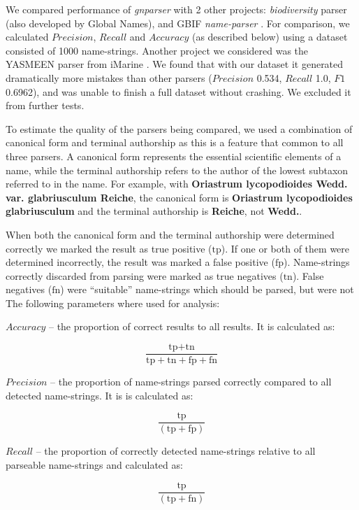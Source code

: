 \documentclass{bmcart}
\begin{document}
We compared performance of \textit{gnparser} with 2 other projects:
\textit{biodiversity} parser \cite{Boyle2013, biodiversity} (also developed by
Global Names), and GBIF \textit{name-parser} \cite{gbifNameParser}. For
comparison, we calculated $Precision$, $Recall$ and $Accuracy$ (as described
below) using a dataset consisted of 1000 name-strings. Another project we
considered was the YASMEEN parser from iMarine  \cite{VandenBerghe2015}. We found that with our dataset it generated dramatically more mistakes
than other parsers ($Precision$ 0.534, $Recall$ 1.0, $F1$ 0.6962), and was
unable to finish a full dataset without crashing. We excluded it from further tests.

To estimate the quality of the parsers being compared, we used a
combination of canonical form and terminal authorship as this is a feature that  common to all three parsers.  A canonical form
represents the essential scientific elements of a name, while the terminal authorship
refers to the author of the lowest subtaxon referred to in the name. For
example, with \textbf{Oriastrum lycopodioides Wedd.  var.  glabriusculum Reiche}, the
canonical form is \textbf{Oriastrum lycopodioides glabriusculum} and the terminal
authorship is \textbf{Reiche}, not \textbf{Wedd.}.

 When both the canonical form and the terminal authorship were determined
correctly we marked the result as true positive ($\text{tp}$).  If one or both
of them were determined incorrectly, the result was marked a false positive
($\text{fp}$). Name-strings correctly discarded from parsing were marked as
true negatives ($\text{tn}$). False negatives ($\text{fn}$) were ``suitable''
name-strings which should be parsed, but were not The
following parameters where used for analysis:

$Accuracy$ -- the proportion of correct results to all results.  It is calculated
as:

\[\dfrac{\text{tp} + \text{tn}} {\text{tp} + \text{tn} + \text{fp} +
    \text{fn}}\]

$Precision$ -- the proportion of name-strings parsed correctly compared to all detected
name-strings. It is is calculated as:

\[\dfrac{\text{tp}}{(\text{tp} + \text{fp})}\]

$Recall$ -- the proportion of correctly detected name-strings relative to all parseable
name-strings and calculated as:

\[\dfrac{\text{tp}}{(\text{tp} + \text{fn})}\]
\end{document}
